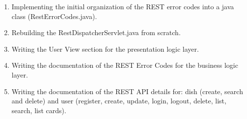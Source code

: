 \begin{description}
\begin{enumerate}
		\item Implementing the initial organization of the REST error codes into a java class (RestErrorCodes.java).
		\item Rebuilding  the RestDispatcherServlet.java from scratch.
		\item Writing the User View section for the presentation logic layer.
		\item Writing the documentation of the REST Error Codes for the  business logic layer.
		\item Writing the documentation of the REST API details for: dish (create, search and delete) and user (register, create, update, login, logout, delete, list, search, list cards).
	\end{enumerate}

\end{description}
